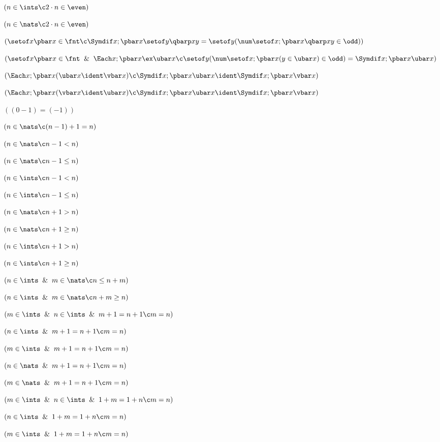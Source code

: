  $(n \in \ints \c 2\cdot n \in \even)$

 $(n \in \nats \c 2\cdot n \in \even)$

 $(\setof x\pbar x\in\fnt 
\c \Symdif x;\pbar x\setof y\qbarp xy =\setof y(\num \setof x ;\pbar x \qbarp xy \in \odd))$

 $(\setof x\pbar x\in\fnt \And \Each x ;\pbar x \ex\ubar x 
\c \setof y (\num \setof x ;\pbar x(y \in \ubar x) \in \odd)= \Symdif x ;\pbar x\ubar x )$

 $(\Each x;\pbar x(\ubar x \ident \vbar x) \c \Symdif x;\pbar x\ubar x\ident\Symdif x;\pbar x\vbar x)$

 $(\Each x;\pbar x(\vbar x \ident \ubar x) \c \Symdif x;\pbar x\ubar x\ident\Symdif x;\pbar x\vbar x)$

 $((0-1)  = (-1))$

 $(n \in \nats \c (n-1) + 1 = n)$

 $(n \in \nats \c n-1 < n)$

 $(n \in \nats \c n-1 \le n)$

 $(n \in \ints \c n-1 < n)$

 $(n \in \ints \c n-1 \le n)$

 $(n \in \nats \c n+1 > n)$

 $(n \in \nats \c n+1 \ge n)$

 $(n \in \ints \c n+1 > n)$

 $(n \in \ints \c n+1 \ge n)$

 $(n \in \ints \And m \in \nats \c n \le n+m)$

 $(n \in \ints \And m \in \nats \c n+m \ge n)$

 $(m\in \ints \And n\in \ints \And m+1=n+1\c m = n)$

 $(n\in \ints \And m+1=n+1\c m = n)$

 $(m\in \ints \And m+1=n+1\c m = n)$

 $(n\in \nats \And m+1=n+1\c m = n)$

 $(m\in \nats \And m+1=n+1\c m = n)$

 $(m\in \ints \And n\in \ints \And 1+m=1+n\c m = n)$

 $(n\in \ints \And 1+m=1+n\c m = n)$

 $(m\in \ints \And 1+m=1+n\c m = n)$


